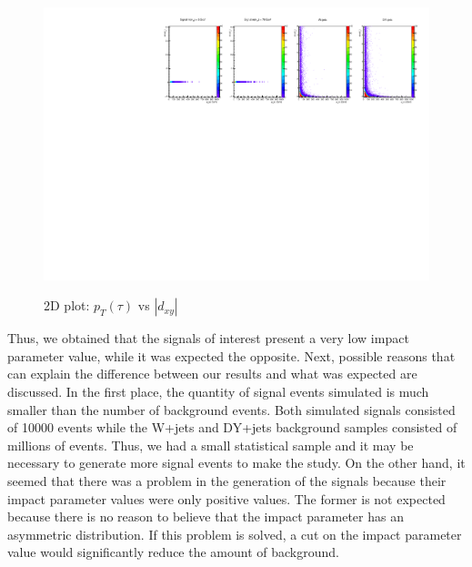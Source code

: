  \begin{figure}[h] 
 \centering
 \caption{2D plot: $p_T(\tau)$ vs $|d_{xy}|$}
 \includegraphics[width=1.15\textwidth]{./Capitulos/Analysis/ipt1_pt} 
 \label{ipt1_pt}
 \end{figure}
 
 
Thus, we obtained that the signals of interest present a very low impact parameter value, while it was expected the opposite. Next, possible reasons that can explain the difference between our results and what was expected are discussed. In the first place, the quantity of signal events simulated is much smaller than the number of background events. Both simulated signals consisted of 10000 events while the W+jets and DY+jets background samples consisted of millions of events. Thus, we had a small statistical sample and it may be necessary to generate more signal events to make the study. On the other hand, it seemed that there was a problem in the generation of the signals because their impact parameter values were only positive values. The former is not expected because there is no reason to believe that the impact parameter has an asymmetric distribution. If this problem is solved, a cut on the impact parameter value would significantly reduce the amount of background.
